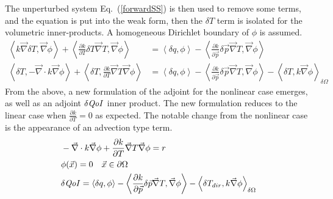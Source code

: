 \documentclass{article}
\newcommand{\vx}{\vec{x}}
\newcommand{\vp}{\vec{p}}
\newcommand{\bra}{\left\langle}
\newcommand{\ket}{\right\rangle}
\newcommand{\ketbd}{\right\rangle_{\delta \Omega}}
\renewcommand{\div}{\vec{\nabla} \cdot}
\newcommand{\grad}{\vec{\nabla}}
\newcommand{\qoi}{{\it QoI}\xspace}
\newcommand{\Tdir}{T_{dir}}
\begin{document}
The unperturbed system Eq.~(\ref{forwardSS}) is then used to remove some terms, and the equation is put into the weak form, then the $\delta T$ term is isolated for the volumetric inner-products. A homogeneous Dirichlet boundary of $\phi$ is assumed.
\begin{align}
\bra k \grad \delta T , \grad \phi \ket + \bra \frac{\partial k}{\partial T} \delta T \grad T  , \grad \phi \ket  &= \bra  \delta q , \phi \ket - \bra \frac{\partial k}{\partial \vp} \delta \vp \grad T , \grad \phi \ket \\
\bra \delta T , - \div k \grad \phi \ket + \bra  \delta T , \frac{ \partial k}{\partial T} \grad T  \grad \phi \ket  &= \bra  \delta q , \phi \ket - \bra \frac{\partial k}{\partial \vp} \delta \vp \grad T , \grad \phi \ket - \bra \delta T , k \grad \phi \ketbd
\end{align}
From the above, a new formulation of the adjoint for the nonlinear case emerges, as well as an adjoint $\delta \qoi$ inner product. The new formulation reduces to the linear case when $\frac{ \partial k}{\partial T}=0$ as expected. The notable change from the nonlinear case is the appearance of an advection type term.
\begin{equation}
\begin{split}
 & - \div k \grad \phi + \frac{ \partial k}{\partial T} \grad T  \grad \phi = r \\
 & \phi(\vx)=0 \quad \vx \in \partial \Omega \\
 & \delta \qoi = \bra  \delta q , \phi \ket - \bra \frac{\partial k}{\partial \vp} \delta \vp \grad T , \grad \phi \ket - \bra \delta \Tdir , k \grad \phi \ketbd
\end{split}
\end{equation}
\end{document}
